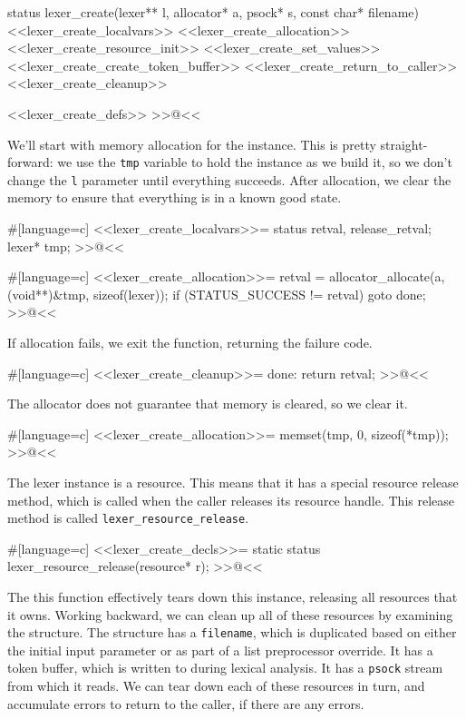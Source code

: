 {status lexer_create(lexer** l, allocator* a, psock* s, const char* filename)
{
    <<lexer_create_localvars>>
    <<lexer_create_allocation>>
    <<lexer_create_resource_init>>
    <<lexer_create_set_values>>
    <<lexer_create_create_token_buffer>>
    <<lexer_create_return_to_caller>>
    <<lexer_create_cleanup>>
}

<<lexer_create_defs>>
>>@<<

We'll start with memory allocation for the instance.  This is pretty
straight-forward: we use the \verb/tmp/ variable to hold the instance as we
build it, so we don't change the \verb/l/ parameter until everything succeeds.
After allocation, we clear the memory to ensure that everything is in a known
good state.

#[language=c]
<<lexer_create_localvars>>=
    status retval, release_retval;
    lexer* tmp;
>>@<<

#[language=c]
<<lexer_create_allocation>>=
    retval = allocator_allocate(a, (void**)&tmp, sizeof(lexer));
    if (STATUS_SUCCESS != retval)
    {
        goto done;
    }
>>@<<

If allocation fails, we exit the function, returning the failure code.

#[language=c]
<<lexer_create_cleanup>>=
done:
    return retval;
>>@<<

The allocator does not guarantee that memory is cleared, so we clear it.

#[language=c]
<<lexer_create_allocation>>=
    memset(tmp, 0, sizeof(*tmp));
>>@<<

The lexer instance is a resource. This means that it has a special resource
release method, which is called when the caller releases its resource handle.
This release method is called \verb/lexer_resource_release/.

#[language=c]
<<lexer_create_decls>>=
static status lexer_resource_release(resource* r);
>>@<<

The this function effectively tears down this instance, releasing all resources
that it owns.  Working backward, we can clean up all of these resources by
examining the structure.  The structure has a \verb/filename/, which is
duplicated based on either the initial input parameter or as part of a list
preprocessor override. It has a token buffer, which is written to during lexical
analysis. It has a \verb/psock/ stream from which it reads. We can tear down
each of these resources in turn, and accumulate errors to return to the caller,
if there are any errors.

}
